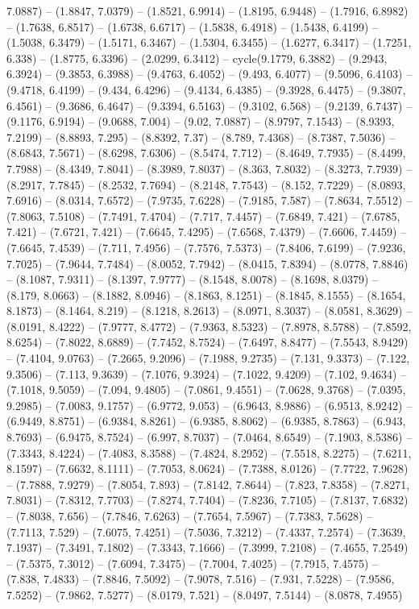 7.0887) -- (1.8847, 7.0379) -- (1.8521, 6.9914) -- (1.8195, 6.9448) -- (1.7916, 6.8982) -- (1.7638, 6.8517) -- (1.6738, 6.6717) -- (1.5838, 6.4918) -- (1.5438, 6.4199) -- (1.5038, 6.3479) -- (1.5171, 6.3467) -- (1.5304, 6.3455) -- (1.6277, 6.3417) -- (1.7251, 6.338) -- (1.8775, 6.3396) -- (2.0299, 6.3412) -- cycle(9.1779, 6.3882) -- (9.2943, 6.3924) -- (9.3853, 6.3988) -- (9.4763, 6.4052) -- (9.493, 6.4077) -- (9.5096, 6.4103) -- (9.4718, 6.4199) -- (9.434, 6.4296) -- (9.4134, 6.4385) -- (9.3928, 6.4475) -- (9.3807, 6.4561) -- (9.3686, 6.4647) -- (9.3394, 6.5163) -- (9.3102, 6.568) -- (9.2139, 6.7437) -- (9.1176, 6.9194) -- (9.0688, 7.004) -- (9.02, 7.0887) -- (8.9797, 7.1543) -- (8.9393, 7.2199) -- (8.8893, 7.295) -- (8.8392, 7.37) -- (8.789, 7.4368) -- (8.7387, 7.5036) -- (8.6843, 7.5671) -- (8.6298, 7.6306) -- (8.5474, 7.712) -- (8.4649, 7.7935) -- (8.4499, 7.7988) -- (8.4349, 7.8041) -- (8.3989, 7.8037) -- (8.363, 7.8032) -- (8.3273, 7.7939) -- (8.2917, 7.7845) -- (8.2532, 7.7694) -- (8.2148, 7.7543) -- (8.152, 7.7229) -- (8.0893, 7.6916) -- (8.0314, 7.6572) -- (7.9735, 7.6228) -- (7.9185, 7.587) -- (7.8634, 7.5512) -- (7.8063, 7.5108) -- (7.7491, 7.4704) -- (7.717, 7.4457) -- (7.6849, 7.421) -- (7.6785, 7.421) -- (7.6721, 7.421) -- (7.6645, 7.4295) -- (7.6568, 7.4379) -- (7.6606, 7.4459) -- (7.6645, 7.4539) -- (7.711, 7.4956) -- (7.7576, 7.5373) -- (7.8406, 7.6199) -- (7.9236, 7.7025) -- (7.9644, 7.7484) -- (8.0052, 7.7942) -- (8.0415, 7.8394) -- (8.0778, 7.8846) -- (8.1087, 7.9311) -- (8.1397, 7.9777) -- (8.1548, 8.0078) -- (8.1698, 8.0379) -- (8.179, 8.0663) -- (8.1882, 8.0946) -- (8.1863, 8.1251) -- (8.1845, 8.1555) -- (8.1654, 8.1873) -- (8.1464, 8.219) -- (8.1218, 8.2613) -- (8.0971, 8.3037) -- (8.0581, 8.3629) -- (8.0191, 8.4222) -- (7.9777, 8.4772) -- (7.9363, 8.5323) -- (7.8978, 8.5788) -- (7.8592, 8.6254) -- (7.8022, 8.6889) -- (7.7452, 8.7524) -- (7.6497, 8.8477) -- (7.5543, 8.9429) -- (7.4104, 9.0763) -- (7.2665, 9.2096) -- (7.1988, 9.2735) -- (7.131, 9.3373) -- (7.122, 9.3506) -- (7.113, 9.3639) -- (7.1076, 9.3924) -- (7.1022, 9.4209) -- (7.102, 9.4634) -- (7.1018, 9.5059) -- (7.094, 9.4805) -- (7.0861, 9.4551) -- (7.0628, 9.3768) -- (7.0395, 9.2985) -- (7.0083, 9.1757) -- (6.9772, 9.053) -- (6.9643, 8.9886) -- (6.9513, 8.9242) -- (6.9449, 8.8751) -- (6.9384, 8.8261) -- (6.9385, 8.8062) -- (6.9385, 8.7863) -- (6.943, 8.7693) -- (6.9475, 8.7524) -- (6.997, 8.7037) -- (7.0464, 8.6549) -- (7.1903, 8.5386) -- (7.3343, 8.4224) -- (7.4083, 8.3588) -- (7.4824, 8.2952) -- (7.5518, 8.2275) -- (7.6211, 8.1597) -- (7.6632, 8.1111) -- (7.7053, 8.0624) -- (7.7388, 8.0126) -- (7.7722, 7.9628) -- (7.7888, 7.9279) -- (7.8054, 7.893) -- (7.8142, 7.8644) -- (7.823, 7.8358) -- (7.8271, 7.8031) -- (7.8312, 7.7703) -- (7.8274, 7.7404) -- (7.8236, 7.7105) -- (7.8137, 7.6832) -- (7.8038, 7.656) -- (7.7846, 7.6263) -- (7.7654, 7.5967) -- (7.7383, 7.5628) -- (7.7113, 7.529) -- (7.6075, 7.4251) -- (7.5036, 7.3212) -- (7.4337, 7.2574) -- (7.3639, 7.1937) -- (7.3491, 7.1802) -- (7.3343, 7.1666) -- (7.3999, 7.2108) -- (7.4655, 7.2549) -- (7.5375, 7.3012) -- (7.6094, 7.3475) -- (7.7004, 7.4025) -- (7.7915, 7.4575) -- (7.838, 7.4833) -- (7.8846, 7.5092) -- (7.9078, 7.516) -- (7.931, 7.5228) -- (7.9586, 7.5252) -- (7.9862, 7.5277) -- (8.0179, 7.521) -- (8.0497, 7.5144) -- (8.0878, 7.4955) 
